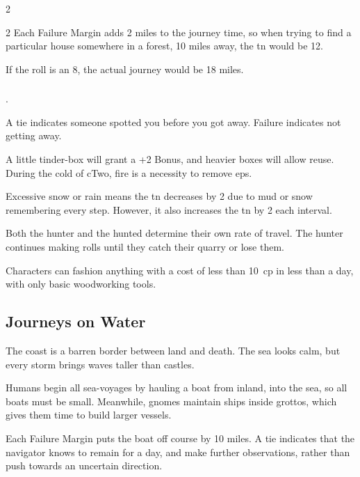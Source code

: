 \begin{multicols}{2}
\begin{multicols}{2}
Each Failure Margin adds 2 miles to the journey time, so when trying to find a particular house somewhere in a forest, 10 miles away, the \gls{tn} would be 12.
\end{multicols}
\noindent
If the roll is an 8, the actual journey would be 18 miles.

\subsubsection{}
.

A tie indicates someone spotted you before you got away.
Failure indicates not getting away.

A little tinder-box will grant a +2 Bonus, and heavier boxes will allow reuse.
During the cold of \gls{cTwo}, fire is a necessity to remove \glspl{ep}.

Excessive snow or rain means the \gls{tn} decreases by 2 due to mud or snow remembering every step.
However, it also increases the \gls{tn} by 2 each \gls{interval}.

Both the hunter and the hunted determine their own rate of travel.
The hunter continues making rolls until they catch their quarry or lose them.

Characters can fashion anything with a cost of less than 10~\gls{cp} in less than a day, with only basic woodworking tools.

\subsection{Journeys on Water}

The coast is a barren border between land and death.
The sea looks calm, but every \gls{storm} brings waves taller than castles.

Humans begin all sea-voyages by hauling a boat from inland, into the sea, so all boats must be small.
Meanwhile, gnomes maintain ships inside grottos, which gives them time to build larger vessels.


Each Failure Margin puts the boat off course by 10 miles.
A tie indicates that the navigator knows to remain for a day, and make further observations, rather than push towards an uncertain direction.


\end{multicols}
